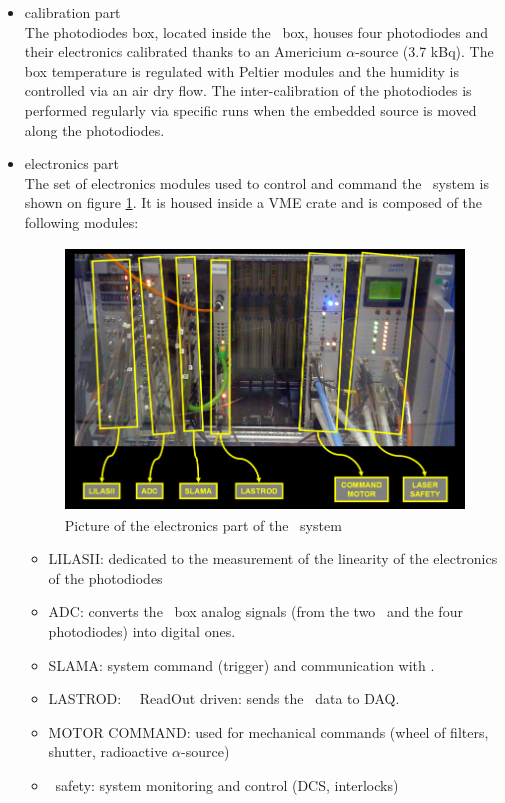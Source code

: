 \begin{itemize}
\item calibration part \\
	
	The photodiodes box, located inside the \las~box, houses four photodiodes and their electronics calibrated thanks to an Americium $\alpha$-source (3.7 kBq). The box temperature is regulated with Peltier modules and the humidity is controlled via an air dry flow. The inter-calibration of the photodiodes is performed regularly via specific runs when the embedded source is moved along the photodiodes. 
	
\item electronics part \\
	
	The set of electronics modules used to control and command the \lasa~system is shown on figure \ref{fig:lasaelectronics}. It is housed inside a VME crate and is composed of the following modules:
	\begin{figure}[htbp]
			\centering
			\includegraphics[height=7cm]{figures/Electronics.png}
			\caption{Picture of the electronics part of the \lasa~system}\label{fig:lasaelectronics}
		\end{figure}	
		
	\begin{itemize}
	\item {\sc LILASII}: dedicated to the measurement of the linearity of the electronics of the photodiodes
	\item {\sc ADC}: converts the \las~box analog signals (from the two \pmts~and the four photodiodes) into digital ones.
	\item {\sc SLAMA}: system command (trigger) and communication with \atlas.
	\item {\sc LASTROD}: \las~\tilecal~ReadOut driven: sends the \las~data to \atlas DAQ.
	\item {\sc MOTOR COMMAND}: used for mechanical commands (wheel of filters, shutter, radioactive $\alpha$-source)
	\item \las~safety: system monitoring and control (DCS, interlocks)
	\end{itemize}
	
\end{itemize}



